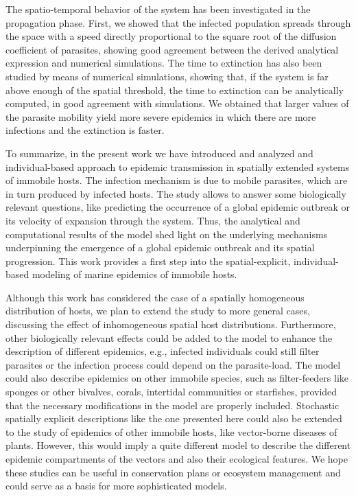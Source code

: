 The spatio-temporal behavior of the system has been investigated in the
propagation phase. First, we showed that the infected population spreads
through the space with a speed directly proportional to the square root of the
diffusion coefficient of parasites, showing good agreement between the derived
analytical expression and numerical simulations. The time to extinction has
also been studied by means of numerical simulations, showing that, if the
system is far above enough of the spatial threshold, the time to extinction can
be analytically computed, in good agreement with simulations. We obtained that
larger values of the parasite mobility yield more severe epidemics in which
there are more infections and the extinction is faster.

To summarize, in the present work we have introduced and analyzed and
individual-based approach to epidemic transmission in spatially extended
systems of immobile hosts. The infection mechanism is due to mobile parasites,
which are in turn produced by infected hosts. The study allows to answer some
biologically relevant questions, like predicting the occurrence of a global
epidemic outbreak or its velocity of expansion through the system. Thus, the
analytical and computational results of the model shed light on the underlying
mechanisms underpinning the emergence of a global epidemic outbreak and its
spatial progression. This work provides a first step into the spatial-explicit,
individual-based modeling of marine epidemics of immobile hosts.

Although this work has considered the case of a spatially homogeneous
distribution of hosts, we plan to extend the study to more general cases,
discussing the effect of inhomogeneous spatial host distributions. Furthermore,
other biologically relevant effects could be added to the model to enhance the
description of different epidemics, e.g., infected individuals could still
filter parasites or the infection process could depend on the parasite-load.
The model could also describe epidemics on other immobile species, such as
filter-feeders like sponges or other bivalves, corals, intertidal communities
or starfishes, provided that the necessary modifications in the model are
properly included. Stochastic spatially explicit descriptions like the one
presented here could also be extended to the study of epidemics of other
immobile hosts, like vector-borne diseases of plants. However, this would imply
a quite different model to describe the different epidemic compartments of the
vectors and also their ecological features. We hope these studies can be useful
in conservation plans or ecosystem management and could serve as a basis for
more sophisticated models.